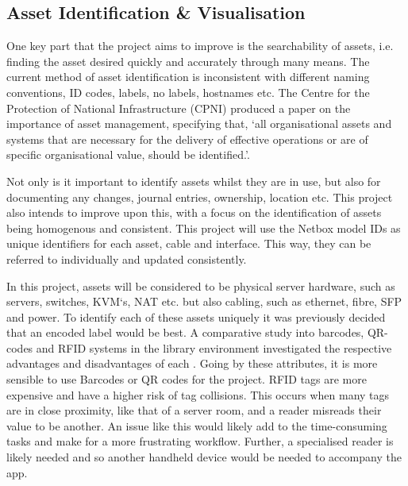 \documentclass [11pt,a4paper]{article}
\begin{document}
\subsection{Asset Identification \& Visualisation}
\label{sec:technical}

One key part that the project aims to improve is the searchability of assets, i.e. finding the asset desired quickly and accurately through many means. The current method of asset identification is inconsistent with different naming conventions, ID codes, labels, no labels, hostnames etc. The Centre for the Protection of National Infrastructure (CPNI) produced a paper on the importance of asset management, specifying that, `all organisational assets and systems that are necessary for the delivery of effective operations or are of specific organisational value, should be identified.'\cite{cpni}.

Not only is it important to identify assets whilst they are in use, but also for documenting any changes, journal entries, ownership, location etc. This project also intends to improve upon this, with a focus on the identification of assets being homogenous and consistent. This project will use the Netbox model IDs as unique identifiers for each asset, cable and interface. This way, they can be referred to individually and updated consistently. 

In this project, assets will be considered to be physical server hardware, such as servers, switches, KVM`s, NAT etc. but also cabling, such as ethernet, fibre, SFP and power. To identify each of these assets uniquely it was previously decided that an encoded label would be best. A comparative study into barcodes, QR-codes and RFID systems in the library environment investigated the respective advantages and disadvantages of each \cite{lotlikar2013comparative}. Going by these attributes, it is more sensible to use Barcodes or QR codes for the project. RFID tags are more expensive and have a higher risk of tag collisions. This occurs when many tags are in close proximity\cite{lotlikar2013comparative}, like that of a server room, and a reader misreads their value to be another. An issue like this would likely add to the time-consuming tasks and make for a more frustrating workflow. Further, a specialised reader is likely needed and so another handheld device would be needed to accompany the app. 
\end{document}

